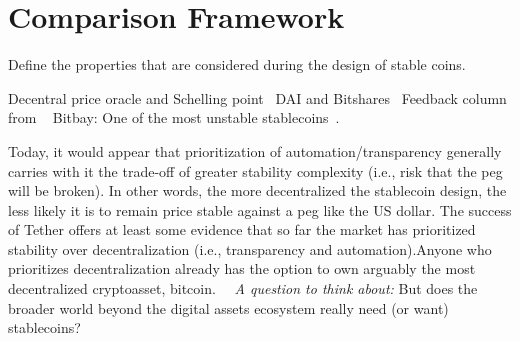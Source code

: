 \section{Comparison Framework} %
Define the properties that are considered during the design of stable coins.
~

Decentral price oracle and Schelling point~\cite{cryptoinsider}
DAI and Bitshares~\cite{cryptoinsider}
Feedback column from ~\cite{report}
Bitbay: One of the most unstable stablecoins~\cite{report}.

Today, it would appear that prioritization of automation/transparency generally carries with it the trade-off of greater stability complexity (i.e., risk that the peg will be broken). In other words, the more decentralized the stablecoin design, the less likely it is to remain price stable against a peg like the US dollar. The success of Tether offers at least some evidence that so far the market has prioritized stability over
decentralization (i.e., transparency and automation).Anyone who prioritizes
decentralization already has the option to own arguably the most decentralized cryptoasset, bitcoin.~\cite{report}
~\textit{A question to think about: }But does the
broader world beyond the digital assets ecosystem really need (or want) stablecoins?~\cite{report}

